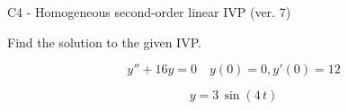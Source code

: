 \begin{exercise}
  \begin{exerciseTitle}C4 - Homogeneous second-order linear IVP (ver. 7)\end{exerciseTitle}
  \begin{exerciseStatement}
    
Find the solution to the given IVP.

    
\[y''+16y = 0 \hspace{1em} y(0) = 0 , y'(0) = 12\]

  \end{exerciseStatement}
  \begin{exerciseAnswer}
    
\[y= 3 \, \sin\left(4 \, t\right)\]

  \end{exerciseAnswer}
\end{exercise}